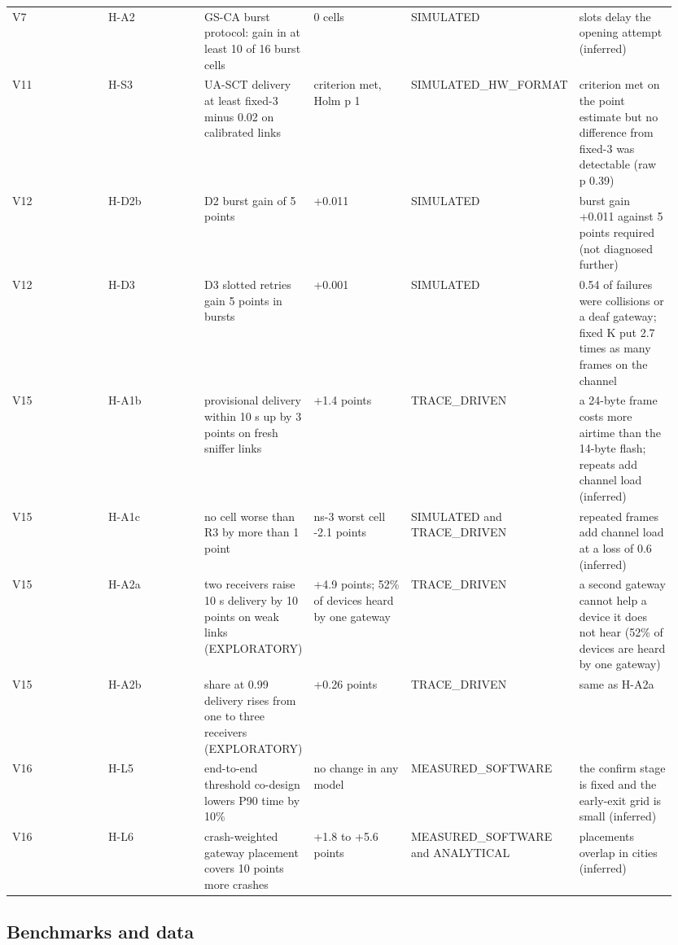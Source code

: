 {\begin{longtable}{p{0.158\linewidth}p{0.158\linewidth}p{0.158\linewidth}p{0.158\linewidth}p{0.158\linewidth}p{0.158\linewidth}}
V7 & H-A2 & GS-CA burst protocol: gain in at least 10 of 16 burst cells & 0 cells & SIMULATED & slots delay the opening attempt (inferred) \\
V11 & H-S3 & UA-SCT delivery at least fixed-3 minus 0.02 on calibrated links & criterion met, Holm p 1 & SIMULATED\_HW\_FORMAT & criterion met on the point estimate but no difference from fixed-3 was detectable (raw p 0.39) \\
V12 & H-D2b & D2 burst gain of 5 points & +0.011 & SIMULATED & burst gain +0.011 against 5 points required (not diagnosed further) \\
V12 & H-D3 & D3 slotted retries gain 5 points in bursts & +0.001 & SIMULATED & 0.54 of failures were collisions or a deaf gateway; fixed K put 2.7 times as many frames on the channel \\
V15 & H-A1b & provisional delivery within 10 s up by 3 points on fresh sniffer links & +1.4 points & TRACE\_DRIVEN & a 24-byte frame costs more airtime than the 14-byte flash; repeats add channel load (inferred) \\
V15 & H-A1c & no cell worse than R3 by more than 1 point & ns-3 worst cell -2.1 points & SIMULATED and TRACE\_DRIVEN & repeated frames add channel load at a loss of 0.6 (inferred) \\
V15 & H-A2a & two receivers raise 10 s delivery by 10 points on weak links (EXPLORATORY) & +4.9 points; 52\% of devices heard by one gateway & TRACE\_DRIVEN & a second gateway cannot help a device it does not hear (52\% of devices are heard by one gateway) \\
V15 & H-A2b & share at 0.99 delivery rises from one to three receivers (EXPLORATORY) & +0.26 points & TRACE\_DRIVEN & same as H-A2a \\
V16 & H-L5 & end-to-end threshold co-design lowers P90 time by 10\% & no change in any model & MEASURED\_SOFTWARE & the confirm stage is fixed and the early-exit grid is small (inferred) \\
V16 & H-L6 & crash-weighted gateway placement covers 10 points more crashes & +1.8 to +5.6 points & MEASURED\_SOFTWARE and ANALYTICAL & placements overlap in cities (inferred) \\
\bottomrule
\end{longtable}}

\subsection*{Benchmarks and data}

